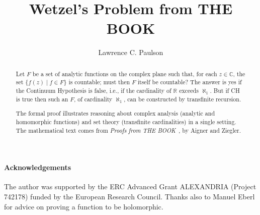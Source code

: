 \documentclass[11pt,a4paper]{article}
\begin{document}
\title{Wetzel's Problem from THE BOOK}
\author{Lawrence C. Paulson}
\maketitle

\begin{abstract}
Let $F$ be a set of analytic functions on the complex plane such that, 
for each $z\in\mathbb{C}$, the set $\{f(z) \mid f\in F\}$ is countable;
must then $F$ itself be countable?
The answer is yes if the Continuum Hypothesis is false, i.e.,
if the cardinality of $\mathbb{R}$ exceeds $\aleph_1$.
But if CH is true then such an $F$, of cardinality $\aleph_1$,
can be constructed by transfinite recursion.

The formal proof illustrates reasoning about complex 
analysis (analytic and homomorphic functions) and set theory
(transfinite cardinalities) in a single setting.
The mathematical text comes from \emph{Proofs from THE BOOK}~\cite[pp.--8]{aigner-proofs}, by Aigner and Ziegler. 
\end{abstract}

\newpage
\tableofcontents

\paragraph*{Acknowledgements}
The author was supported by the ERC Advanced Grant ALEXANDRIA (Project 742178) funded by the European Research Council. 
Thanks also to Manuel Eberl for advice on proving a function to be holomorphic.

\newpage





\end{document}
